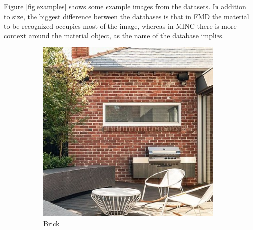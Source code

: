 \documentclass[12pt,a4paper]{article}
\begin{document}
	Figure \ref{fig:examples} shows some example images from the datasets. In addition to size, the biggest difference between the databases is that in FMD the material to be recognized occupies most of the image, whereas in MINC there is more context around the material object, as the name of the database implies.
	
	\begin{figure}
		\centering
		\captionsetup[subfigure]{labelformat=empty}
		\begin{subfigure}[c]{0.23\linewidth}
			\includegraphics[width=\linewidth]{./imgs/minc1}
			\caption{Brick}
			\vspace{5mm}
		\end{subfigure}
		\begin{subfigure}[c]{0.23\linewidth}

\end{subfigure}
\end{figure}
\end{document}
